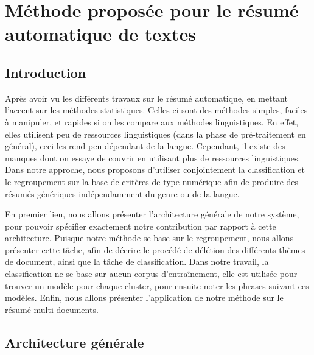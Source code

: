 \documentclass[a4paper,12pt,oneside]{../use/ESIthesis}
\begin{document}
  	 	
  	 	\dominitoc 
  	 	\mainmatter
  \fi

\chapter{Méthode proposée pour le résumé automatique de textes}
\label{chap:mine}
\minitoc

\section{Introduction}

Après avoir vu les différents travaux sur le résumé automatique, en mettant l'accent sur les méthodes statistiques. 
Celles-ci sont des méthodes simples, faciles à manipuler, et rapides si on les compare aux méthodes linguistiques. 
En effet, elles utilisent peu de ressources linguistiques (dans la phase de pré-traitement en général), ceci les rend peu dépendant de la langue. 
Cependant, il existe des manques dont on essaye de couvrir en utilisant plus de ressources linguistiques. 
Dans notre approche, nous proposons d'utiliser conjointement la classification et le regroupement sur la base de critères de type numérique afin de produire des résumés génériques indépendamment du genre ou de la langue.

En premier lieu, nous allons présenter l'architecture générale de notre système, pour pouvoir spécifier exactement notre contribution par rapport à cette architecture. 
Puisque notre méthode se base sur le regroupement, nous allons présenter cette tâche, afin de décrire le procédé de délétion des différents thèmes de document, ainsi que la tâche de classification. 
Dans notre travail, la classification ne se base sur aucun corpus d'entraînement, elle est utilisée pour trouver un modèle pour chaque cluster, pour ensuite noter les phrases suivant ces modèles. 
Enfin, nous allons présenter l'application de notre méthode sur le résumé multi-documents.

\section{Architecture générale}
\end{document}
